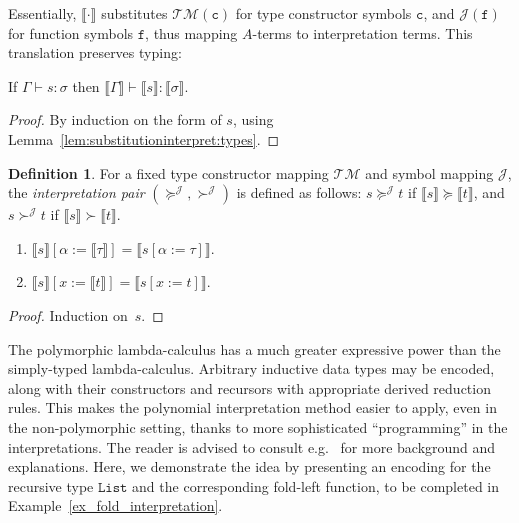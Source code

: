 \documentclass[a4paper,UKenglish,cleveref,autoref,numberwithinsect]{lipics-v2019}
\theoremstyle{definition}
\newtheorem{defn}[theorem]{Definition}
\newcommand{\typeinterpret}[1]{\llbracket #1 \rrbracket}
\newcommand{\interpret}[1]{\llbracket #1 \rrbracket}
\newcommand{\itp}[1]{\llbracket #1 \rrbracket}
\newcommand{\Typemap}{\mathcal{T\!M}}
\newcommand{\Termmap}{\mathcal{J}}
\newcommand{\succinterpret}{\succ^{\Termmap}}
\newcommand{\succeqinterpret}{\succeq^{\Termmap}}
\newcommand{\List}{\mathtt{List}}
\begin{document}
Essentially, $\interpret{\cdot}$ substitutes
$\Typemap(\mathtt{c})$ for type constructor symbols $\mathtt{c}$, and
$\Termmap(\mathtt{f})$ for function symbols $\mathtt{f}$, thus mapping
$A$-terms to interpretation terms.  This translation preserves typing:

\begin{lemma}
  If $\Gamma \vdash s : \sigma$ then $\itp{\Gamma} \vdash
  \interpret{s} : \typeinterpret{\sigma}$.
\end{lemma}

\begin{proof}
  By induction on the form of $s$, using
  Lemma~\ref{lem:substitutioninterpret:types}.
\end{proof}

\begin{defn}
  For a fixed type constructor mapping $\Typemap$ and symbol mapping
  $\Termmap$, the \emph{interpretation pair}
  $(\succeqinterpret,\succinterpret)$ is defined as follows: $s
  \succeqinterpret t$ if $\interpret{s} \succeq \interpret{t}$, and $s
  \succinterpret t$ if $\interpret{s} \succ \interpret{t}$.
\end{defn}

\begin{lemma}\label{lem:substitutioninterpret}
  \begin{enumerate}
  \item\label{lem:substitutioninterpret:mixed}
    $\interpret{s}[\alpha:=\typeinterpret{\tau}] =
    \interpret{s[\alpha:=\tau]}$.
  \item\label{lem:substitutioninterpret:terms}
    $\interpret{s}[x:=\interpret{t}] = \interpret{s[x:=t]}$.
  \end{enumerate}
\end{lemma}

\begin{proof}
  Induction on~$s$.
\end{proof}

\begin{remark}
The polymorphic lambda-calculus has a much greater expressive power
than the simply-typed lambda-calculus. Arbitrary inductive data types
may be encoded, along with their constructors and recursors with
appropriate derived reduction rules. This makes the polynomial
interpretation method easier to apply, even in the non-polymorphic
setting, thanks to more sophisticated ``programming'' in the interpretations.
The reader is advised to consult e.g.~\cite[Chapter~11]{Girard1989}
for more background and explanations. Here, we demonstrate the idea
by presenting an encoding for the recursive type $\List$ and the
corresponding fold-left function, to be completed in
Example~\ref{ex_fold_interpretation}.
\end{remark}
\end{document}
